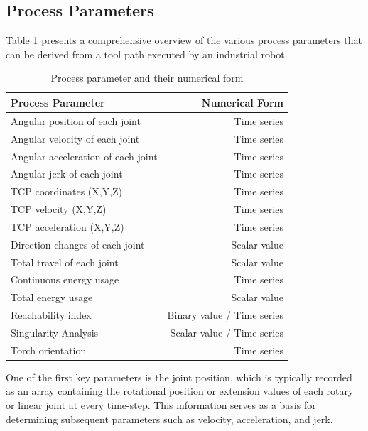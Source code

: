 
\subsection{Process Parameters}\label{pp}


Table \ref{procesparameters} presents a comprehensive overview of the various process parameters that can be derived from a tool path executed by an industrial robot. 


\begin{table}[H]
	\centering
	\begin{tabular}{||l|r||}
		\hline
		Process Parameter & Numerical Form\\
		\hline
		\hline
		\hline
		Angular position of each joint & Time series\\
		Angular velocity of each joint & Time series\\
		Angular acceleration of each joint& Time series\\
		Angular jerk of each joint& Time series\\
		\hline
		\hline	
		
		TCP coordinates (X,Y,Z) & Time series\\
		TCP velocity (X,Y,Z) & Time series\\
		TCP acceleration (X,Y,Z) & Time series\\
		\hline
		\hline
		Direction changes of each joint& Scalar value\\
		Total travel of each joint& Scalar value\\		
		
		\hline
		\hline
		Continuous energy usage & Time series\\
		Total energy usage & Scalar value\\
		\hline
		\hline
		Reachability index & Binary value / Time series\\
		Singularity Analysis & Scalar value / Time series\\
		Torch orientation & Time series\\
		
		
		\hline
		\hline
		
	\end{tabular}
	
	
	\caption{Process parameter and their numerical form}
	\label{procesparameters}
\end{table}

One of the first key parameters is the joint position, which is typically recorded as an array containing the rotational position or extension values of each rotary or linear joint at every time-step. This information serves as a basis for determining subsequent parameters such as velocity, acceleration, and jerk.
 
